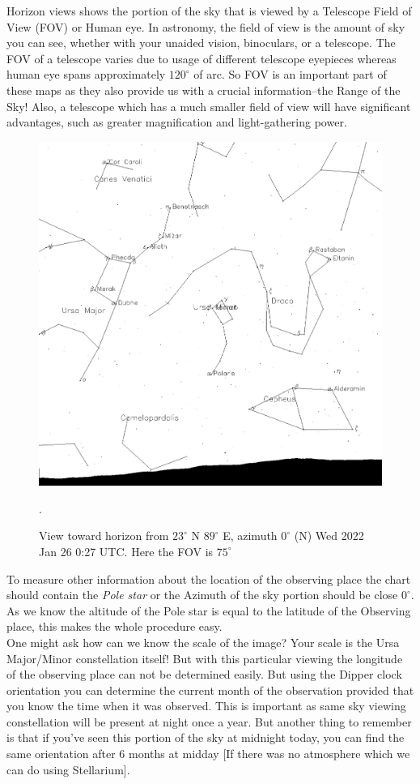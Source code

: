 \documentclass[a4paper,12pt]{extarticle}
\begin{document}
Horizon views shows the portion of the sky that is viewed by a Telescope Field of View (FOV) or Human eye. In astronomy, the field of view is the amount of sky you can see, whether with your unaided vision, binoculars, or a telescope. The FOV of a telescope varies due to usage of different telescope eyepieces whereas human eye spans approximately $120^\circ$ of arc. So FOV is an important part of these maps as they also provide us with a crucial information--the Range of the Sky! Also, a telescope which has a much smaller field of view will have significant advantages, such as greater magnification and light-gathering power. 
\begin{figure}[H]
    \centering
    \includegraphics[width=0.6\linewidth]{Hor_1.png}
    \caption{View toward horizon from $23^\circ$ N $89^\circ$ E, azimuth $0^\circ$ (N) Wed 2022 Jan 26 0:27 UTC. Here the FOV is $75^\circ$}.
\end{figure}

To measure other information about the location of the observing place the chart should contain the \textit{Pole star} or the Azimuth of the sky portion should be close $0^\circ$. As we know the altitude of the Pole star is equal to the latitude of the Observing place, this makes the whole procedure easy. \\

One might ask how can we know the scale of the image? Your scale is the Ursa Major/Minor constellation itself! But with this particular viewing the longitude of the observing place can not be determined easily. But using the Dipper clock orientation you can determine the current month of the observation provided that you know the time when it was observed. This is important as same sky viewing constellation will be present at night once a year. But another thing to remember is that if you've seen this portion of the sky at midnight today, you can find the same orientation after 6 months at midday [If there was no atmosphere which we can do using Stellarium].\\
\end{document}
